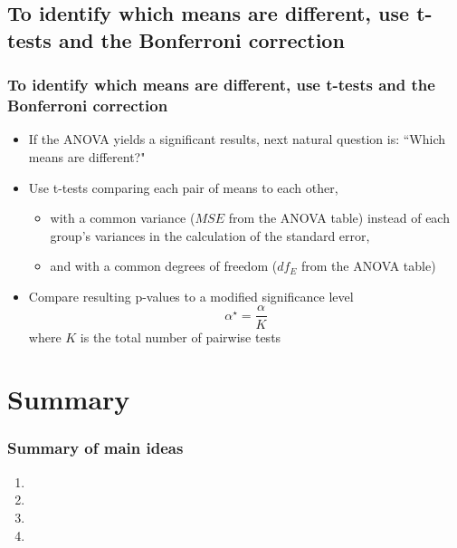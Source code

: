 \documentclass[11pt,containsverbatim,handout,xcolor=xelatex,dvipsnames,table]{beamer}
\begin{document}

\subsection{To identify which means are different, use t-tests and the Bonferroni correction}
\label{mi4}


\begin{frame}
\frametitle{To identify which means are different, use t-tests and the Bonferroni correction}

\begin{itemize}

\item If the ANOVA yields a significant results, next natural question is: ``Which means are different?"

\item Use t-tests comparing each pair of means to each other, 
\begin{itemize}
\item with a common variance ($MSE$ from the ANOVA table) instead of each group's variances in the 
calculation of the standard error,
\item and with a common degrees of freedom ($df_E$ from the ANOVA table)
\end{itemize}

\item Compare resulting p-values to a modified significance level
\[ \alpha^\star = \frac{\alpha}{K} \]
where $K$ is the total number of pairwise tests

\end{itemize}

\end{frame}


\begin{frame}

\vfill


\vfill

\end{frame}


\section{Summary}


\begin{frame}
\frametitle{Summary of main ideas}

\vfill

\begin{enumerate}

\item {}

\item {}

\item {}

\item {}

\end{enumerate}

\vfill

\end{frame}

\end{document}
